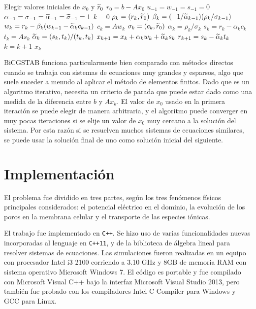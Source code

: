 \begin{algorithmic}
	\STATE Elegir valores iniciales de $x_0$ y $\widetilde{r}_0$
	\STATE $r_0 = b - A x_0$
	\STATE $u_{-1} = w_{-1} = s_{-1} = 0$
	\STATE $\alpha_{-1} = \sigma_{-1} = \widetilde{\alpha}_{-1} = \widetilde{\sigma}_{-1} = 1$
	\STATE $k = 0$
	\REPEAT
		\STATE $\rho_k = \left( r_k, \widetilde{r}_0 \right)$
		\STATE $\beta_k = (-1 / \widetilde{\alpha}_{k-1}) (\rho_k / \sigma_{k-1})$
		\STATE $w_k = r_k - \beta_k (w_{k-1} - \widetilde{\alpha}_{k} c_{k-1})$
		\STATE $c_k = A w_k$
		\STATE $\sigma_k = (c_k, \widetilde{r}_0)$
		\STATE $\alpha_k = \rho_k / \sigma_k$
		\STATE $s_k = r_k - \alpha_k c_k$
		\STATE $t_k = A s_k$ 
		\STATE $\widetilde{\alpha}_{k} = (s_k,t_k) / (t_k, t_k)$
		\STATE $x_{k+1} = x_k + \alpha_k w_k + \widetilde{\alpha}_{k} s_k$
		\STATE $r_{k+1} = s_k - \widetilde{\alpha}_{k} t_k$
		\STATE $k = k + 1$
	\RETURN $x_k$
\end{algorithmic}

BiCGSTAB funciona particularmente bien comparado con métodos directos cuando se trabaja con sistemas de ecuaciones muy grandes y esparsos, algo que suele suceder a menudo al aplicar el método de elementos finitos. Dado que es un algoritmo iterativo, necesita un criterio de parada que puede estar dado como una medida de la diferencia entre $b$ y $A x_k$. El valor de $x_0$ usado en la primera iteración se puede elegir de manera arbitraria, y el algoritmo puede converger en muy pocas iteraciones si se elije un valor de $x_0$ muy cercano a la solución del sistema. Por esta razón si se resuelven muchos sistemas de ecuaciones similares, se puede usar la solución final de uno como solución inicial del siguiente. 

\section{Implementación}
El problema fue dividido en tres partes, según los tres fenómenos físicos principales considerados: el potencial eléctrico en el dominio, la evolución de los poros en la membrana celular y el transporte de las especies iónicas. 

El trabajo fue implementado en \texttt{C++}. Se hizo uso de varias funcionalidades nuevas incorporadas al lenguaje en \texttt{C++11}, y de la biblioteca de álgebra lineal  para resolver sistemas de ecuaciones. Las simulaciones fueron realizadas en un equipo con procesador Intel i3 2100 corriendo a 3.10 GHz y 8GB de memoria RAM con sistema operativo Microsoft Windows 7. El código es portable y fue compilado con Microsoft Visual C++ bajo la interfaz Microsoft Visual Studio 2013, pero también fue probado con los compiladores Intel C Compiler para Windows y GCC para Linux.

